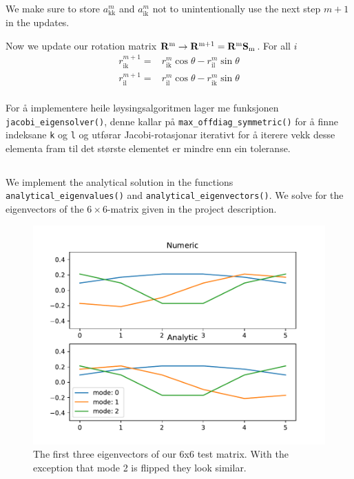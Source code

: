 \documentclass[a4paper,10pt,english]{article}
\begin{document}
We make sure to store $a_{\text{kk}}^{m}$ and $a_{\text{ik}}^{m}$ not to unintentionally use the next step
$m+1$ in the updates.

Now we update our rotation matrix $\bold{R}^{\text{m}} \rightarrow \bold{R}^{\text{m+1}} = \bold{R}^{\text{m}}\bold{S}_{\text{m}}$. For all $i$
\begin{align}
r_{\text{ik}}^{m+1} =& r_{\text{ik}}^{m}\cos\theta - r_{\text{il}}^{m}\sin\theta \\
r_{\text{il}}^{m+1} =& r_{\text{il}}^{m}\cos\theta - r_{\text{ik}}^{m}\sin\theta \\
\end{align}

For å implementere heile løysingsalgoritmen lager me funksjonen \lstinline{jacobi_eigensolver()},
denne kallar på \lstinline{max_offdiag_symmetric()} for å finne indeksane \lstinline{k} og \lstinline{l} og
utførar Jacobi-rotasjonar iterativt for å iterere vekk desse elementa fram til det største elementet er
mindre enn ein toleranse.


			\subsection{}
            We implement the analytical solution in the functions \lstinline{analytical_eigenvalues()} and
            \lstinline{analytical_eigenvectors()}. We solve for the eigenvectors of the $6\times 6$-matrix
            given in the project description.

			\begin{figure}[ht]
			  \centering
			  \includegraphics[width=1.0\linewidth]{figures/problem4b.pdf}
			  \caption{The first three eigenvectors of our 6x6 test matrix. With the exception that mode 2 is flipped they look similar.}
              \label{fig:prob4b}
			\end{figure}
\end{document}

